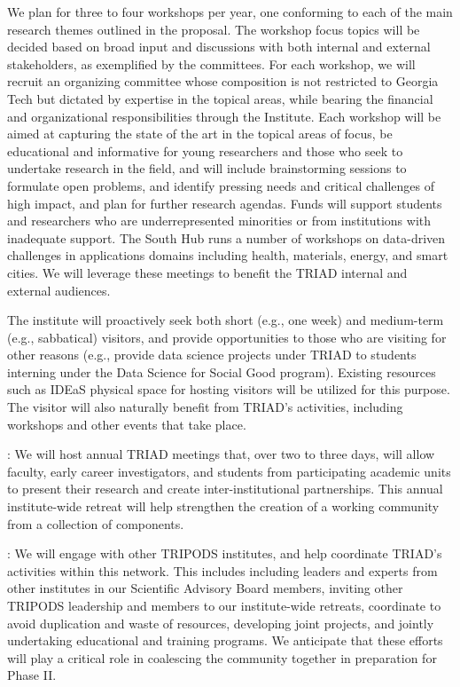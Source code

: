 \documentclass[12pt]{article}
\begin{document}
We plan for three to four workshops per year, one  conforming to each of the main research themes outlined in the proposal. The workshop focus topics will be decided based on broad input and discussions with both internal and external stakeholders, as exemplified by the committees. For each workshop, we will recruit an organizing committee whose composition is not restricted to Georgia Tech but dictated by expertise in the topical areas, while bearing the financial and organizational responsibilities through the Institute. Each workshop will be aimed at capturing the state of the art in the topical areas of focus, be educational and informative for young researchers and those who seek to undertake research in the field, and will include brainstorming sessions to formulate open problems, and identify pressing needs and critical challenges of high impact, and plan for further research agendas. Funds will support students and researchers who are underrepresented minorities or from institutions with inadequate support. The South Hub runs a number of workshops on data-driven challenges in applications domains including health, materials, energy, and smart cities. We will leverage these meetings to benefit the TRIAD internal and external audiences.

The institute will proactively seek both short (e.g., one week) and medium-term (e.g., sabbatical) visitors, and provide opportunities to those who are visiting for other reasons (e.g., provide data science projects under TRIAD to students interning under the Data Science for Social Good program). Existing resources such as IDEaS physical space for hosting visitors will be utilized for this purpose. The visitor will also naturally benefit from TRIAD's activities, including workshops and other events that take place.

:
We will host  annual TRIAD  meetings that, over two to three days, will allow faculty, early career investigators, and students from participating academic units to present their research and create inter-institutional partnerships. This annual institute-wide retreat will help strengthen the creation of a working community from a collection of components.

:
We will engage with other TRIPODS institutes, and help coordinate TRIAD's activities within this network. This includes including leaders and experts from other institutes in our Scientific Advisory Board members, inviting other TRIPODS  leadership and members to our institute-wide retreats, coordinate to avoid duplication and waste of resources, developing joint projects, and jointly undertaking educational and training programs. We anticipate that these efforts will play a critical role in coalescing the community together in preparation for Phase II.
\end{document}
